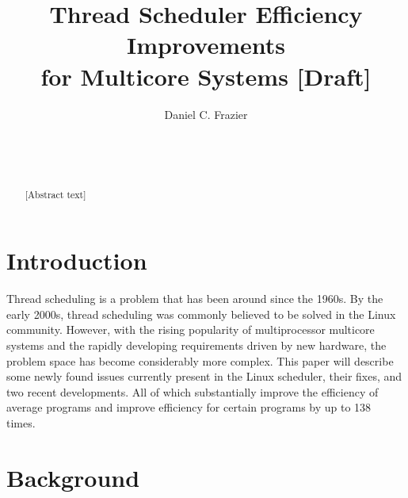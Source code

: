 \documentclass{sig-alternate}
\begin{document}

\title{Thread Scheduler Efficiency Improvements \\ for Multicore Systems [Draft]}


\author{
\alignauthor
Daniel C. Frazier\\
	\\
	\\
	\\
}
\maketitle


\begin{abstract}
[Abstract text]
\end{abstract}


\section{Introduction}
\label{sec:intro}

Thread scheduling is a problem that has been around since the 1960s. By the early 2000s, thread scheduling was commonly believed to be solved in the Linux community. However, with the rising popularity of multiprocessor multicore systems and the rapidly developing requirements driven by new hardware, the problem space has become considerably more complex. This paper will describe some newly found issues currently present in the Linux scheduler, their fixes, and two recent developments. All of which substantially improve the efficiency of average programs and improve efficiency for certain programs by up to 138 times.~\cite{Lozi:2016}

\section{Background}
\label{sec:bg}
\end{document}
